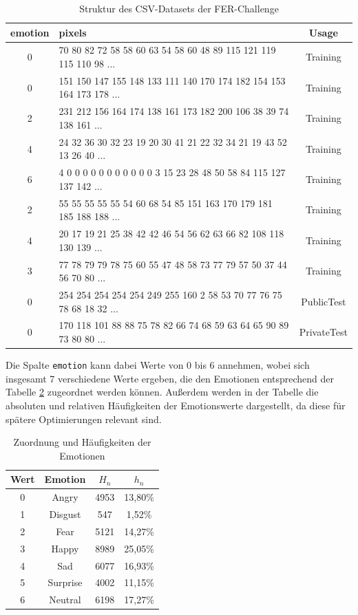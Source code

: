 \documentclass[12pt, a4paper]{scrbook}
\begin{document}
\begin{table}[h]
\centering
\begin{tabular}[t]{c|l|c}
emotion & pixels & Usage \\
\hline
0 & 70 80 82 72 58 58 60 63 54 58 60 48 89 115 121 119 115 110 98 ... & Training \\
0 & 151 150 147 155 148 133 111 140 170 174 182 154 153 164 173 178 ... & Training \\
2 & 231 212 156 164 174 138 161 173 182 200 106 38 39 74 138 161 ... & Training \\
4 & 24 32 36 30 32 23 19 20 30 41 21 22 32 34 21 19 43 52 13 26 40 ... & Training \\
6 & 4 0 0 0 0 0 0 0 0 0 0 0 3 15 23 28 48 50 58 84 115 127 137 142 ... & Training \\
2 & 55 55 55 55 55 54 60 68 54 85 151 163 170 179 181 185 188 188 ... & Training \\
4 & 20 17 19 21 25 38 42 42 46 54 56 62 63 66 82 108 118 130 139 ... & Training \\
3 & 77 78 79 79 78 75 60 55 47 48 58 73 77 79 57 50 37 44 56 70 80 ... & Training \\
0 & 254 254 254 254 254 249 255 160 2 58 53 70 77 76 75 78 68 18 32 ... & PublicTest \\
0 & 170 118 101 88 88 75 78 82 66 74 68 59 63 64 65 90 89 73 80 80 ... & PrivateTest \\
\hline
\end{tabular}
\caption{Struktur des CSV-Datasets der FER-Challenge}
\label{tab:FER2013}
\end{table}
Die Spalte \texttt{emotion} kann dabei Werte von 0 bis 6 annehmen, wobei sich insgesamt 7 verschiedene Werte ergeben, die den Emotionen entsprechend der Tabelle \ref{tab:feremotions} zugeordnet werden können. Außerdem werden in der Tabelle die absoluten und relativen Häufigkeiten der Emotionswerte dargestellt, da diese für spätere Optimierungen relevant sind.
\begin{table}[h]
\centering
\begin{tabular}[t]{c|c|c|c}
Wert & Emotion & $H_n$ & $h_n$ \\
\hline
0 & Angry & 4953 & 13,80\% \\
1 & Disgust & 547 & 1,52\% \\
2 & Fear & 5121 & 14,27\% \\
3 & Happy & 8989 & 25,05\% \\
4 & Sad & 6077 & 16,93\% \\
5 & Surprise & 4002 & 11,15\% \\
6 & Neutral & 6198 & 17,27\% \\
\hline
\end{tabular}
\caption{Zuordnung und Häufigkeiten der Emotionen}
\label{tab:feremotions}
\end{table}
\end{document}
